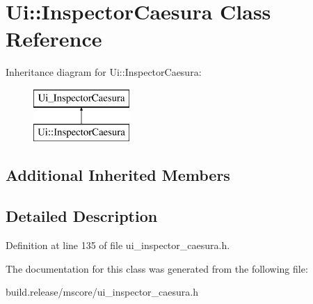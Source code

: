 \hypertarget{class_ui_1_1_inspector_caesura}{}\section{Ui\+:\+:Inspector\+Caesura Class Reference}
\label{class_ui_1_1_inspector_caesura}
Inheritance diagram for Ui\+:\+:Inspector\+Caesura\+:\begin{figure}[H]
\begin{center}
\leavevmode
\includegraphics[height=2.000000cm]{class_ui_1_1_inspector_caesura}
\end{center}
\end{figure}
\subsection*{Additional Inherited Members}


\subsection{Detailed Description}


Definition at line 135 of file ui\+\_\+inspector\+\_\+caesura.\+h.



The documentation for this class was generated from the following file\+:\begin{DoxyCompactItemize}
\item 
build.\+release/mscore/ui\+\_\+inspector\+\_\+caesura.\+h\end{DoxyCompactItemize}
